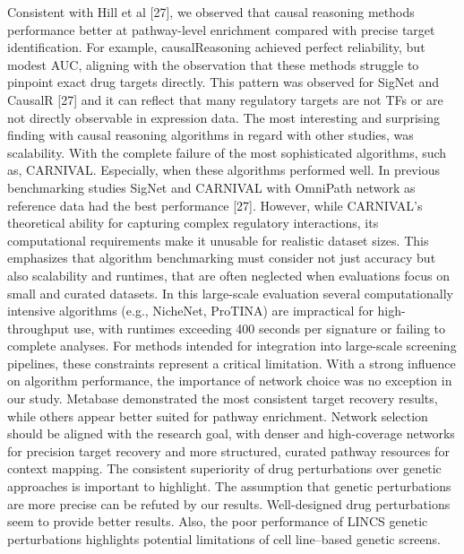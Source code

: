 Consistent with Hill et al [27], we observed that causal reasoning methods performance better at pathway-level enrichment compared with precise target identification. For example, causalReasoning achieved perfect reliability, but modest AUC, aligning with the observation that these methods struggle to pinpoint exact drug targets directly. This pattern was observed for SigNet and CausalR [27] and it can reflect that many regulatory targets are not TFs or are not directly observable in expression data. The most interesting and surprising finding with causal reasoning algorithms in regard with other studies, was scalability. With the complete failure of the most sophisticated algorithms, such as, CARNIVAL. Especially, when these algorithms performed well. In previous benchmarking studies SigNet and CARNIVAL with OmniPath network as reference data had the best performance [27]. However, while CARNIVAL's theoretical ability for capturing complex regulatory interactions, its computational requirements make it unusable for realistic dataset sizes. This emphasizes that algorithm benchmarking must consider not just accuracy but also scalability and runtimes, that are often neglected when evaluations focus on small and curated datasets. In this large-scale evaluation several computationally intensive algorithms (e.g., NicheNet, ProTINA) are impractical for high-throughput use, with runtimes exceeding 400 seconds per signature or failing to complete analyses. For methods intended for integration into large-scale screening pipelines, these constraints represent a critical limitation.
With a strong influence on algorithm performance, the importance of network choice was no exception in our study. Metabase demonstrated the most consistent target recovery results, while others appear better suited for pathway enrichment. Network selection should be aligned with the research goal, with denser and high-coverage networks for precision target recovery and more structured, curated pathway resources for context mapping.
The consistent superiority of drug perturbations over genetic approaches is important to highlight. The assumption that genetic perturbations are more precise can be refuted by our results. Well-designed drug perturbations seem to provide better results. Also, the poor performance of LINCS genetic perturbations highlights potential limitations of cell line–based genetic screens.

